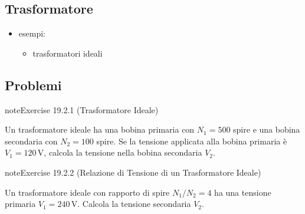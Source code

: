 \documentclass[letterpaper,10pt,italian]{jupyterBook}
\begin{document}
\subsection{Trasformatore}
\label{\detokenize{ch/electromagnetism/circuits-magnetic:trasformatore}}\begin{itemize}
\item {} 
\sphinxAtStartPar
esempi:
\begin{itemize}
\item {} 
\sphinxAtStartPar
trasformatori ideali

\end{itemize}

\end{itemize}

\sphinxstepscope


\subsection{Problemi}
\label{\detokenize{ch/electromagnetism/circuits-magnetic-problems:problemi}}\label{\detokenize{ch/electromagnetism/circuits-magnetic-problems:physics-hs-electromagnetism-circuits-magnetic-problems}}\label{\detokenize{ch/electromagnetism/circuits-magnetic-problems::doc}} \label{exercise:ch/electromagnetism/circuits-magnetic-problems-exercise-0}

\begin{sphinxadmonition}{note}{Exercise 19.2.1 (Trasformatore Ideale)}



\sphinxAtStartPar
Un trasformatore ideale ha una bobina primaria con \(N_1 = 500\) spire e una bobina secondaria con \(N_2 = 100\) spire. Se la tensione applicata alla bobina primaria è \(V_1 = 120 \, \text{V}\), calcola la tensione nella bobina secondaria \(V_2\).
\end{sphinxadmonition}
 \label{exercise:ch/electromagnetism/circuits-magnetic-problems-exercise-1}

\begin{sphinxadmonition}{note}{Exercise 19.2.2 (Relazione di Tensione di un Trasformatore Ideale)}



\sphinxAtStartPar
Un trasformatore ideale con rapporto di spire \(N_1/N_2 = 4\) ha una tensione primaria \(V_1 = 240 \, \text{V}\). Calcola la tensione secondaria \(V_2\).
\end{sphinxadmonition}
 \label{exercise:ch/electromagnetism/circuits-magnetic-problems-exercise-2}
\end{document}

